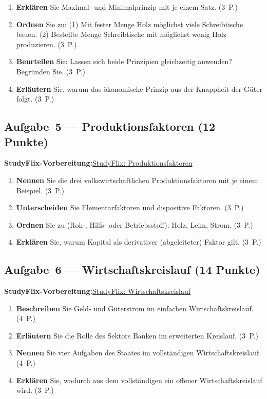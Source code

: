 \documentclass[11pt, a4paper]{article}
\begin{document}
\medskip
\begin{enumerate}[label=(\alph*)]
  \item \textbf{Erklären} Sie Maximal- und Minimalprinzip mit je einem Satz. \hfill (3~P.)
  \item \textbf{Ordnen} Sie zu: (1) Mit fester Menge Holz möglichst viele Schreibtische bauen. (2) Bestellte Menge Schreibtische mit möglichst wenig Holz produzieren. \hfill (3~P.)
  \item \textbf{Beurteilen} Sie: Lassen sich beide Prinzipien gleichzeitig anwenden? Begründen Sie. \hfill (3~P.)
  \item \textbf{Erläutern} Sie, warum das ökonomische Prinzip aus der Knappheit der Güter folgt. \hfill (3~P.)
\end{enumerate}

\subsection*{Aufgabe~5 --- Produktionsfaktoren (12 Punkte)}

\noindent\textbf{\color{bfwAccent}StudyFlix-Vorbereitung:}\enspace \href{https://studyflix.de/wirtschaft/produktionsfaktoren-1699}{StudyFlix: Produktionsfaktoren}

\medskip
\begin{enumerate}[label=(\alph*)]
  \item \textbf{Nennen} Sie die drei volkswirtschaftlichen Produktionsfaktoren mit je einem Beispiel. \hfill (3~P.)
  \item \textbf{Unterscheiden} Sie Elementarfaktoren und dispositive Faktoren. \hfill (3~P.)
  \item \textbf{Ordnen} Sie zu (Roh-, Hilfs- oder Betriebsstoff): Holz, Leim, Strom. \hfill (3~P.)
  \item \textbf{Erklären} Sie, warum Kapital als derivativer (abgeleiteter) Faktor gilt. \hfill (3~P.)
\end{enumerate}

\subsection*{Aufgabe~6 --- Wirtschaftskreislauf (14 Punkte)}

\noindent\textbf{\color{bfwAccent}StudyFlix-Vorbereitung:}\enspace \href{https://studyflix.de/wirtschaft/wirtschaftskreislauf-1755}{StudyFlix: Wirtschaftskreislauf}

\medskip
\begin{enumerate}[label=(\alph*)]
  \item \textbf{Beschreiben} Sie Geld- und Güterstrom im einfachen Wirtschaftskreislauf. \hfill (4~P.)
  \item \textbf{Erläutern} Sie die Rolle des Sektors Banken im erweiterten Kreislauf. \hfill (3~P.)
  \item \textbf{Nennen} Sie vier Aufgaben des Staates im vollständigen Wirtschaftskreislauf. \hfill (4~P.)
  \item \textbf{Erklären} Sie, wodurch aus dem vollständigen ein offener Wirtschaftskreislauf wird. \hfill (3~P.)
\end{enumerate}
\end{document}
